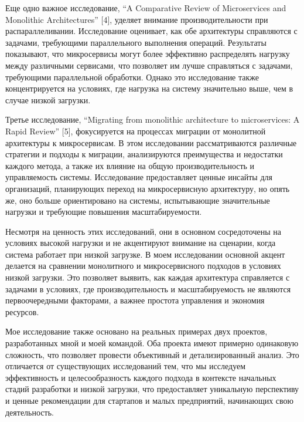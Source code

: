     Еще одно важное исследование, “A Comparative Review of Microservices and Monolithic Architectures” [4], уделяет внимание производительности при распараллеливании. Исследование оценивает, как обе архитектуры справляются с задачами, требующими параллельного выполнения операций. Результаты показывают, что микросервисы могут более эффективно распределять нагрузку между различными сервисами, что позволяет им лучше справляться с задачами, требующими параллельной обработки. Однако это исследование также концентрируется на условиях, где нагрузка на систему значительно выше, чем в случае низкой загрузки.
    
    Третье исследование, “Migrating from monolithic architecture to microservices: A Rapid Review” [5], фокусируется на процессах миграции от монолитной архитектуры к микросервисам. В этом исследовании рассматриваются различные стратегии и подходы к миграции, анализируются преимущества и недостатки каждого метода, а также их влияние на общую производительность и управляемость системы. Исследование предоставляет ценные инсайты для организаций, планирующих переход на микросервисную архитектуру, но опять же, оно больше ориентировано на системы, испытывающие значительные нагрузки и требующие повышения масштабируемости.
    
    Несмотря на ценность этих исследований, они в основном сосредоточены на условиях высокой нагрузки и не акцентируют внимание на сценарии, когда система работает при низкой загрузке. В моем исследовании основной акцент делается на сравнении монолитного и микросервисного подходов в условиях низкой загрузки. Это позволяет выявить, как каждая архитектура справляется с задачами в условиях, где производительность и масштабируемость не являются первоочередными факторами, а важнее простота управления и экономия ресурсов.
    
    Мое исследование также основано на реальных примерах двух проектов, разработанных мной и моей командой. Оба проекта имеют примерно одинаковую сложность, что позволяет провести объективный и детализированный анализ. Это отличается от существующих исследований тем, что мы исследуем эффективность и целесообразность каждого подхода в контексте начальных стадий разработки и низкой загрузки, что предоставляет уникальную перспективу и ценные рекомендации для стартапов и малых предприятий, начинающих свою деятельность.

